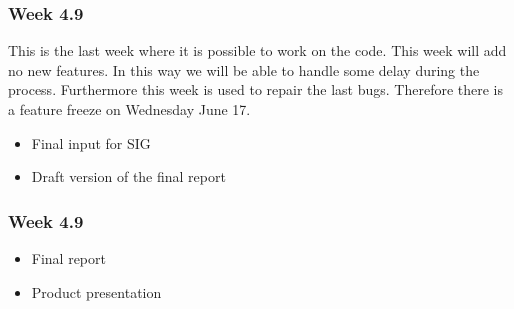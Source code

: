 \subsubsection{Week 4.9}
	This is the last week where it is possible to work on the code. This week will add no new features. In this way we will be able to handle some delay during the process. Furthermore this week is used to repair the last bugs. Therefore there is a feature freeze on Wednesday June 17. 
\begin{itemize}
	\item Final input for SIG
	\item Draft version of the final report
\end{itemize}
\subsubsection{Week 4.9}
\begin{itemize}
	\item Final report
	\item Product presentation
\end{itemize}